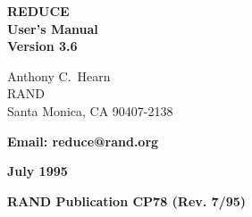 

\setlength{\parindent}{0pt}

\setlength{\parskip}{6pt}

\setlength{\hfuzz}{5pt}  %
\setlength{\vfuzz}{1pt}

\renewcommand{\sloppy}{\tolerance=9999\relax%
                       \setlength{\emergencystretch}{0.2\hsize}}


\raggedbottom

\newlength{\reduceboxwidth}
\setlength{\reduceboxwidth}{4in}

\newlength{\redboxwidth}
\setlength{\redboxwidth}{3.5in}

\newlength{\rboxwidth}
\setlength{\rboxwidth}{2.6in}

\newcommand{\REDUCE}{REDUCE}
\newcommand{\RLISP}{RLISP}
\newcommand{\underscore}{\_}
\newcommand{\ttindex}[1]{{\renewcommand{\_}{\protect\underscore}%
                          \index{#1@{\tt #1}}}}
\newcommand{\COMPATNOTE}{{\em Compatibility Note:\ }}
\newcommand{\meta}[1]{\mbox{$\langle$\it#1\/$\rangle$}}

\setlength{\topsep}{0.5\baselineskip}  %
\setlength{\itemsep}{\topsep}
\setlength{\abovedisplayskip}{\topsep}  %
\setlength{\belowdisplayskip}{\topsep}

\newcommand{\key}[1]{\fbox{\sf #1}}

\pagestyle{headings}

\makeindex


\pagestyle{empty}
\begin{titlepage}
\vspace*{\fill}
\begin{center}

{\Huge\bf {\REDUCE}} \\ [0.2cm]
{\LARGE\bf User's Manual\vspace{0.4cm} \\
  Version 3.6}

\vspace{0.5in}\large\bf

Anthony C.\ Hearn \\
RAND \\
Santa Monica, CA 90407-2138

\vspace{0.1in}

\bf Email: reduce@rand.org

\vspace{0.5in}

\large\bf July 1995

\vspace*{2.5in}

\bf RAND Publication CP78 (Rev. 7/95)
\end{center}
\end{titlepage}

